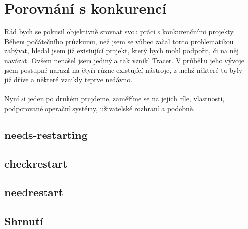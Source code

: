 \documentclass[10pt,a4paper]{article}
\begin{document}
	\section{Porovnání s konkurencí}
		Rád bych se pokusil objektivně srovnat svou práci s konkurenčními projekty. Během počátečního průzkumu, než jsem se vůbec začal touto problematikou zabývat, hledal jsem již existující projekt, který bych mohl podpořit, či na něj navázat. Ovšem nenašel jsem jediný a tak vznikl Tracer. V průběhu jeho vývoje jsem postupně narazil na čtyři různé existující nástroje, z nichž některé tu byly již dříve a některé vznikly teprve nedávno.
		\\
		\\
		Nyní si jeden po druhém projdeme, zaměříme se na jejich cíle, vlastnosti, podporované operační systémy, uživatelské rozhraní a podobně.
		\subsection{needs-restarting}
		\subsection{checkrestart}
		\subsection{needrestart}
		\subsection{Shrnutí}
\end{document}
